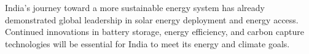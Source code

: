 \documentclass[12pt]{article}
\begin{document}
\begin{spacing}{1.5}
India’s journey toward a more sustainable energy system has already demonstrated global leadership in solar energy deployment and energy access. Continued innovations in battery storage, energy efficiency, and carbon capture technologies will be essential for India to meet its energy and climate goals.

\end{spacing}
\end{document}
